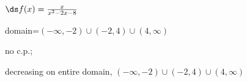 {$\ds f(x) =\frac{x}{x^2-2x-8}$
}
{domain=$(-\infty,-2)\cup(-2,4)\cup(4,\infty)$

no c.p.; 

decreasing on entire domain, $(-\infty,-2)\cup(-2,4)\cup(4,\infty)$
}
